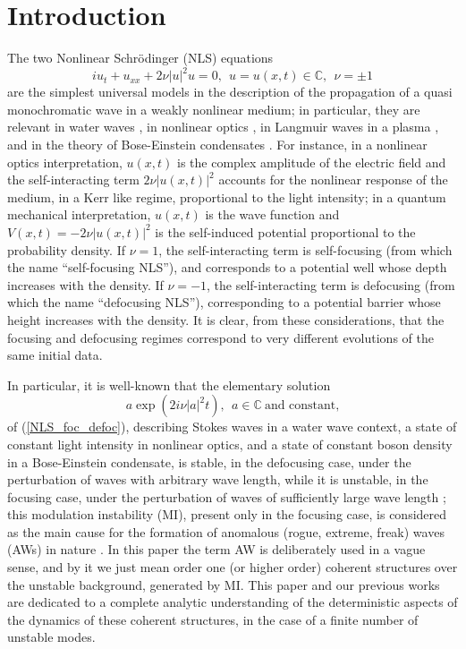\documentclass[12pt]{article}
\newcommand{\CC}{\mathbb C}
\newcommand{\beq}{\begin{equation}}
\newcommand{\eeq}{\end{equation}}
\begin{document}
\section{Introduction}

The two Nonlinear Schr\"odinger (NLS) equations 
\beq\label{NLS_foc_defoc}
i u_t +u_{xx}+2 \nu |u|^2 u=0, \ \ u=u(x,t)\in\CC, \ \ \nu=\pm 1
\eeq
are the simplest universal models in the description of the propagation of a quasi monochromatic wave in a weakly nonlinear medium; in particular, they are relevant in water waves \cite{Zakharov,AS}, in nonlinear optics \cite{Solli,Bortolozzo,PMContiADelRe}, in Langmuir waves in a plasma \cite{Sulem}, and in the theory of Bose-Einstein condensates \cite{Bludov,Pita}. For instance, in a nonlinear optics interpretation, $u(x,t)$ is the complex amplitude of the electric field and the self-interacting term $2\nu |u(x,t)|^2$ accounts for the nonlinear response of the medium, in a Kerr like regime, proportional to the light intensity; in a quantum mechanical interpretation, $u(x,t)$ is the wave function and $V(x,t)=-2\nu |u(x,t)|^2$ is the self-induced potential proportional to the probability density. If $\nu=1$, the self-interacting term is self-focusing (from which the name ``self-focusing NLS''), and corresponds to a potential well whose depth increases with the density. If $\nu=-1$, the self-interacting term is defocusing (from which the name ``defocusing NLS''), corresponding to a potential barrier whose height increases with the density. It is clear, from these considerations, that the focusing and defocusing regimes correspond to very different evolutions of the same initial data.

In particular, it is well-known that the elementary solution
\beq\label{background0}
a \exp (2i \nu |a|^2t), \ \ a\in \CC \ \mbox{and constant,}
\eeq
of (\ref{NLS_foc_defoc}), describing Stokes waves \cite{Stokes} in a water wave context, a state of constant light intensity in nonlinear optics, and a state of constant boson density in a Bose-Einstein condensate, is stable, in the defocusing case, under the perturbation of waves with arbitrary wave length, while it is unstable, in the focusing case, under the perturbation of waves of sufficiently large wave length \cite{Talanov,BF,Zakharov,ZakharovOstro,Taniuti,Salasnich}; this modulation instability (MI), present only in the focusing case, is considered as the main cause for the formation of anomalous (rogue, extreme, freak) waves (AWs) in nature \cite{HendersonPeregrine,Dysthe,Osborne,KharifPeli1,KharifPeli2,Onorato2}. In this paper the term AW is deliberately used in a vague sense, and by it we just mean order one (or higher order) coherent structures over the unstable background, generated by MI. This paper and our previous works \cite{GS1,GS2,GS3,GS4} are dedicated to a complete analytic understanding of the deterministic aspects of the dynamics of these coherent structures, in the case of a finite number of unstable modes.
\end{document}
